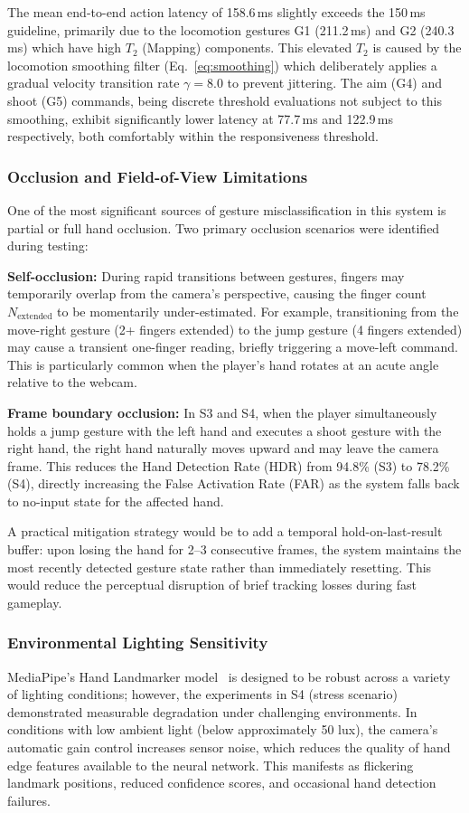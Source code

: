 \documentclass[journal,onecolumn,12pt,draftclsnofoot]{IEEEtran}
\begin{document}
\begin{itemize}
The mean end-to-end action latency of 158.6\,ms slightly exceeds the 150\,ms guideline, primarily due to the locomotion gestures G1 (211.2\,ms) and G2 (240.3\,ms) which have high $T_2$ (Mapping) components. This elevated $T_2$ is caused by the locomotion smoothing filter (Eq.~\ref{eq:smoothing}) which deliberately applies a gradual velocity transition rate $\gamma = 8.0$ to prevent jittering. The aim (G4) and shoot (G5) commands, being discrete threshold evaluations not subject to this smoothing, exhibit significantly lower latency at 77.7\,ms and 122.9\,ms respectively, both comfortably within the responsiveness threshold.

\subsubsection{Occlusion and Field-of-View Limitations}
One of the most significant sources of gesture misclassification in this system is partial or full hand occlusion. Two primary occlusion scenarios were identified during testing:

\textbf{Self-occlusion:} During rapid transitions between gestures, fingers may temporarily overlap from the camera's perspective, causing the finger count $N_{\text{extended}}$ to be momentarily under-estimated. For example, transitioning from the move-right gesture (2+ fingers extended) to the jump gesture (4 fingers extended) may cause a transient one-finger reading, briefly triggering a move-left command. This is particularly common when the player's hand rotates at an acute angle relative to the webcam.

\textbf{Frame boundary occlusion:} In S3 and S4, when the player simultaneously holds a jump gesture with the left hand and executes a shoot gesture with the right hand, the right hand naturally moves upward and may leave the camera frame. This reduces the Hand Detection Rate (HDR) from 94.8\% (S3) to 78.2\% (S4), directly increasing the False Activation Rate (FAR) as the system falls back to no-input state for the affected hand.

A practical mitigation strategy would be to add a temporal hold-on-last-result buffer: upon losing the hand for 2--3 consecutive frames, the system maintains the most recently detected gesture state rather than immediately resetting. This would reduce the perceptual disruption of brief tracking losses during fast gameplay.

\subsubsection{Environmental Lighting Sensitivity}
MediaPipe's Hand Landmarker model~\cite{b3} is designed to be robust across a variety of lighting conditions; however, the experiments in S4 (stress scenario) demonstrated measurable degradation under challenging environments. In conditions with low ambient light (below approximately 50 lux), the camera's automatic gain control increases sensor noise, which reduces the quality of hand edge features available to the neural network. This manifests as flickering landmark positions, reduced confidence scores, and occasional hand detection failures.


\end{itemize}
\end{document}
